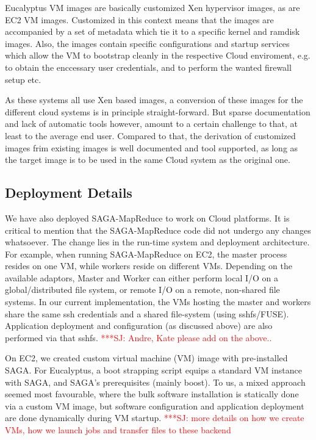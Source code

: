 \documentclass[conference,final]{IEEEtran}
\newcommand{\jhanote}[1]{ {\textcolor{red} { ***SJ: #1 }}}
\newcommand{\jhanote}[1]{}
\newcommand{\sagamapreduce }{SAGA-MapReduce }
\begin{document}
Eucalyptus VM images are basically customized Xen hypervisor images,
as are EC2 VM images.  Customized in this context means that the
images are accompanied by a set of metadata which tie it to a specific
kernel and ramdisk images.  Also, the images contain specific
configurations and startup services which allow the VM to bootstrap
cleanly in the respective Cloud enviroment, e.g. to obtain the
enccessary user credentials, and to perform the wanted firewall setup
etc.

As these systems all use Xen based images, a conversion of these
images for the different cloud systems is in principle
straight-forward.  But sparse documentation and lack of automatic
tools however, amount to a certain challenge to that, at least to the
average end user. Compared to that, the derivation of customized
images frim existing images is well documented and tool supported, as
long as the target image is to be used in the same Cloud system as the
original one.





\subsection{Deployment Details}

We have also deployed \sagamapreduce to work on Cloud platforms.  It
is critical to mention that the \sagamapreduce code did not undergo
any changes whatsoever. The change lies in the run-time system and
deployment architecture. For example, when running \sagamapreduce on
EC2, the master process resides on one VM, while workers reside on
different VMs.  Depending on the available adaptors, Master and Worker
can either perform local I/O on a global/distributed file system, or
remote I/O on a remote, non-shared file systems.  In our current
implementation, the VMs hosting the master and workers share the same
ssh credentials and a shared file-system (using sshfs/FUSE).
Application deployment and configuration (as discussed above) are also
performed via that sshfs.  \jhanote{Andre, Kate please add on the
  above..}

On EC2, we created custom virtual machine (VM) image with
pre-installed SAGA.  For Eucalyptus, a boot strapping script equips a
standard VM instance with SAGA, and SAGA's prerequisites (mainly
boost).  To us, a mixed approach seemed most favourable, where the
bulk software installation is statically done via a custom VM image,
but software configuration and application deployment are done
dynamically during VM startup.  \jhanote{more details on how we create
  VMs, how we launch jobs and transfer files to these backend}
\end{document}
